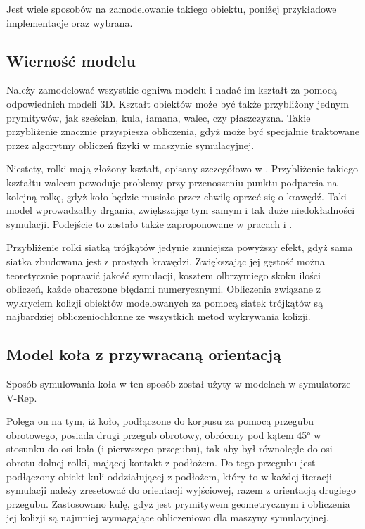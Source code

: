 	Jest wiele sposobów na zamodelowanie takiego obiektu, poniżej przykładowe implementacje oraz wybrana.
	
	\subsection{Wierność modelu}
		Należy zamodelować wszystkie ogniwa modelu i nadać im kształt za pomocą odpowiednich modeli 3D.
		Kształt obiektów może być także przybliżony jednym prymitywów, jak sześcian, kula, łamana, walec, czy płaszczyzna.
		Takie przybliżenie znacznie przyspiesza obliczenia, gdyż może być specjalnie traktowane przez algorytmy obliczeń fizyki
		w maszynie symulacyjnej.

		Niestety, rolki mają złożony kształt, opisany szczegółowo w \cite{rollers}.
		Przybliżenie takiego kształtu walcem powoduje problemy przy przenoszeniu punktu podparcia na kolejną rolkę, gdyż koło będzie musiało przez chwilę oprzeć się o krawędź.
		Taki model wprowadzałby drgania, zwiększając tym samym i tak duże niedokładności symulacji.
		Podejście to zostało także zaproponowane w pracach \cite{modelling_ways} i \cite{braking}.

		Przybliżenie rolki siatką trójkątów jedynie zmniejsza powyższy efekt, gdyż sama siatka zbudowana jest z prostych krawędzi.
		Zwiększając jej gęstość można teoretycznie poprawić jakość symulacji, kosztem olbrzymiego skoku ilości obliczeń, każde obarczone błędami numerycznymi.
		Obliczenia związane z wykryciem kolizji obiektów modelowanych za pomocą siatek trójkątów są najbardziej obliczeniochłonne ze wszystkich metod wykrywania kolizji. 

	\subsection{Model koła z przywracaną orientacją}
		Sposób symulowania koła w ten sposób został użyty w modelach w symulatorze V-Rep.

		Polega on na tym, iż koło, podłączone do korpusu za pomocą przegubu obrotowego, posiada drugi przegub obrotowy, 
		obrócony pod kątem 45° w stosunku do osi koła (i pierwszego przegubu), tak aby był równolegle do osi obrotu dolnej rolki, mającej kontakt z podłożem.
		Do tego przegubu jest podłączony obiekt kuli oddziałującej z podłożem, który to w każdej iteracji symulacji należy zresetować do orientacji wyjściowej, razem z
		orientacją drugiego przegubu.
		Zastosowano kulę, gdyż jest prymitywem geometrycznym i obliczenia jej kolizji są najmniej wymagające obliczeniowo dla maszyny symulacyjnej.

